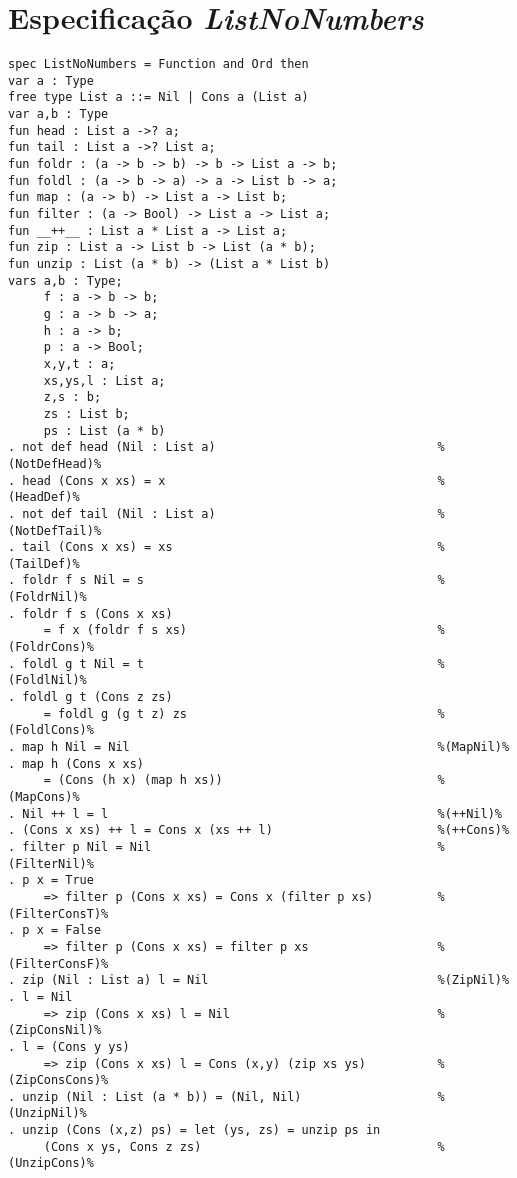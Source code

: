 \section{Especificação \textit{ListNoNumbers}}
\label{appendix:strictSpec:listNoNumbers}
\begin{Verbatim}
spec ListNoNumbers = Function and Ord then
var a : Type
free type List a ::= Nil | Cons a (List a)
var a,b : Type
fun head : List a ->? a;
fun tail : List a ->? List a;
fun foldr : (a -> b -> b) -> b -> List a -> b;
fun foldl : (a -> b -> a) -> a -> List b -> a;
fun map : (a -> b) -> List a -> List b;
fun filter : (a -> Bool) -> List a -> List a;
fun __++__ : List a * List a -> List a;
fun zip : List a -> List b -> List (a * b);
fun unzip : List (a * b) -> (List a * List b)
vars a,b : Type; 
     f : a -> b -> b; 
     g : a -> b -> a;
     h : a -> b; 
     p : a -> Bool; 
     x,y,t : a; 
     xs,ys,l : List a; 
     z,s : b; 
     zs : List b; 
     ps : List (a * b)
. not def head (Nil : List a)                               %(NotDefHead)%
. head (Cons x xs) = x                                      %(HeadDef)%
. not def tail (Nil : List a)                               %(NotDefTail)%
. tail (Cons x xs) = xs                                     %(TailDef)%
. foldr f s Nil = s                                         %(FoldrNil)%
. foldr f s (Cons x xs) 
     = f x (foldr f s xs)                                   %(FoldrCons)%
. foldl g t Nil = t                                         %(FoldlNil)%
. foldl g t (Cons z zs) 
     = foldl g (g t z) zs                                   %(FoldlCons)%
. map h Nil = Nil                                           %(MapNil)%
. map h (Cons x xs)       
     = (Cons (h x) (map h xs))                              %(MapCons)%
. Nil ++ l = l                                              %(++Nil)%
. (Cons x xs) ++ l = Cons x (xs ++ l)                       %(++Cons)%
. filter p Nil = Nil                                        %(FilterNil)%
. p x = True 
     => filter p (Cons x xs) = Cons x (filter p xs)         %(FilterConsT)%
. p x = False 
     => filter p (Cons x xs) = filter p xs                  %(FilterConsF)%
. zip (Nil : List a) l = Nil                                %(ZipNil)%
. l = Nil 
     => zip (Cons x xs) l = Nil                             %(ZipConsNil)%
. l = (Cons y ys) 
     => zip (Cons x xs) l = Cons (x,y) (zip xs ys)          %(ZipConsCons)%
. unzip (Nil : List (a * b)) = (Nil, Nil)                   %(UnzipNil)%
. unzip (Cons (x,z) ps) = let (ys, zs) = unzip ps in
     (Cons x ys, Cons z zs)                                 %(UnzipCons)%

\end{Verbatim}

